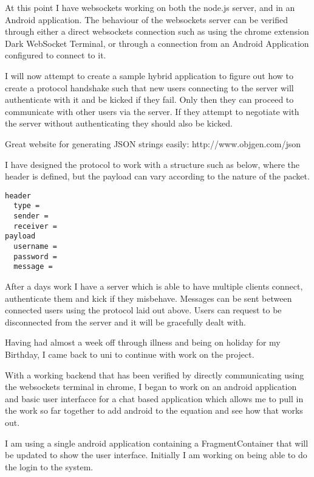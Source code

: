 \documentclass[idxtotoc,hyperref,openany]{labbook} %
\begin{document}

At this point I have websockets working on both the node.js server, and in an Android application.  The behaviour of the websockets server can be verified through either a direct websockets connection such as using the chrome extension Dark WebSocket Terminal, or through a connection from an Android Application configured to connect to it.

I will now attempt to create a sample hybrid application to figure out how to create a protocol handshake such that new users connecting to the server will authenticate with it and be kicked if they fail.  Only then they can proceed to communicate with other users via the server.  If they attempt to negotiate with the server without authenticating they should also be kicked.

Great website for generating JSON strings easily: http://www.objgen.com/json

I have designed the protocol to work with a structure such as below, where the header is defined, but the payload can vary according to the nature of the packet.

\begin{lstlisting}
header
  type = 
  sender = 
  receiver = 
payload
  username = 
  password = 
  message = 
 \end{lstlisting}

 After a days work I have a server which is able to have multiple clients connect, authenticate them and kick if they misbehave.  Messages can be sent between connected users using the protocol laid out above.  Users can request to be disconnected from the server and it will be gracefully dealt with.



 Having had almost a week off through illness and being on holiday for my Birthday, I came back to uni to continue with work on the project.

 With a working backend that has been verified by directly communicating using the websockets terminal in chrome, I began to work on an android application and basic user interfacce for a chat based application which allows me to pull in the work so far together to add android to the equation and see how that works out.

 I am using a single android application containing a FragmentContainer that will be updated to show the user interface.  Initially I am working on being able to do the login to the system.
\end{document}
